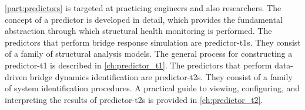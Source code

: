 \cref{part:predictors} is targeted at practicing engineers and also researchers. 
The concept of a \gls{predictor} is developed in detail,
which provides the fundamental abstraction through which structural health
monitoring is performed.
The predictors that perform bridge response simulation are \glspl{predictor-t1}. They consist of a family of structural analysis models. The general process for constructing a \gls{predictor-t1} is described in \cref{ch:predictor_t1}. The predictors that perform data-driven bridge dynamics identification are \glspl{predictor-t2}. They consist of a family of system identification procedures. A practical guide to viewing, configuring, and interpreting the results of \glspl{predictor-t2} is provided in \cref{ch:predictor_t2}.